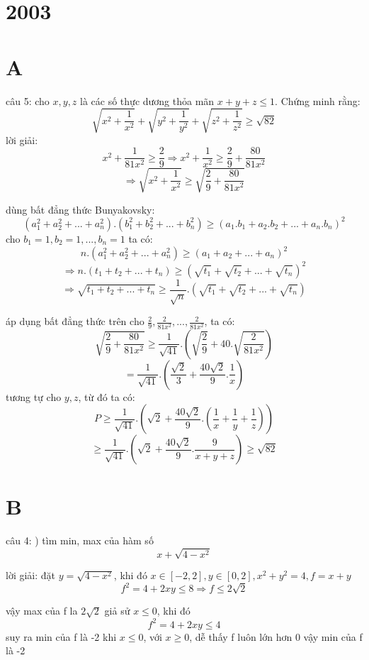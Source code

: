 \documentclass{article}
\begin{document}
\section*{2003}
\section*{A}

câu 5: cho $x,y,z$ là các số thực dương thỏa mãn $x+y+z\leq1$. Chứng minh rằng:
\[\sqrt{x^2+\frac{1}{x^2}}+\sqrt{y^2+\frac{1}{y^2}}+\sqrt{z^2+\frac{1}{z^2}}\geq\sqrt{82}\]
lời giải: 
\[x^2+\frac{1}{81x^2}\geq\frac{2}{9}\Rightarrow x^2+\frac{1}{x^2}\geq\frac{2}{9}+\frac{80}{81x^2}\]
\[\Rightarrow \sqrt{x^2+\frac{1}{x^2}}\geq\sqrt{\frac{2}{9}+\frac{80}{81x^2}}\]

dùng bất đẳng thức Bunyakovsky:
\[(a_1^2+a_2^2+...+a_n^2).(b_1^2+b_2^2+...+b_n^2)\geq(a_1.b_1+a_2.b_2+...+a_n.b_n)^2\]
cho $b_1=1, b_2=1, ..., b_n=1$ ta có:
\[n.(a_1^2+a_2^2+...+a_n^2)\geq(a_1+a_2+...+a_n)^2\]
\[\Rightarrow n.(t_1+t_2+...+t_n)\geq(\sqrt{t_1}+\sqrt{t_2}+...+\sqrt{t_n})^2\]
\[\Rightarrow \sqrt{t_1+t_2+...+t_n}\geq\frac{1}{\sqrt{n}}.(\sqrt{t_1}+\sqrt{t_2}+...+\sqrt{t_n})\]

áp dụng bất đẳng thức trên cho $\frac{2}{9}, \frac{2}{81x^2},..., \frac{2}{81x^2}$, ta có:
\[\sqrt{\frac{2}{9}+\frac{80}{81x^2}}\geq\frac{1}{\sqrt{41}}.(\sqrt{\frac{2}{9}}+40.\sqrt{\frac{2}{81x^2}})\]
\[=\frac{1}{\sqrt{41}}.(\frac{\sqrt{2}}{3}+\frac{40\sqrt{2}}{9}.\frac{1}{x})\]
tương tự cho $y,z$, từ đó ta có:
\[P\geq\frac{1}{\sqrt{41}}.(\sqrt{2}+\frac{40\sqrt{2}}{9}.(\frac{1}{x}+\frac{1}{y}+\frac{1}{z}))\]
\[\geq\frac{1}{\sqrt{41}}.(\sqrt{2}+\frac{40\sqrt{2}}{9}.\frac{9}{x+y+z})\geq\sqrt{82}\]

\section*{B}






câu 4:
) tìm min, max của hàm số 
\[x+\sqrt{4-x^2}\]

lời giải:
đặt $y=\sqrt{4-x^2}$, khi đó $x\in [ -2,2] , y\in [ 0,2], x^2+y^2=4, f=x+y$
\[f^2=4+2xy\leq 8\Rightarrow f\leq2\sqrt{2}\]

vậy max của f la $2\sqrt{2}$
\newline
giả sử $x\leq0$, khi đó
\[f^2=4+2xy\leq4\]
suy ra min của f là -2 khi $x\leq0$, 
\newline
với $x\geq0$, dễ thấy f luôn lớn hơn 0
\newline
vậy min của f là -2
\end{document}
